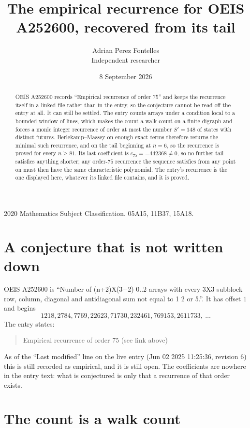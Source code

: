 \documentclass[11pt,a4paper]{article}
\title{The empirical recurrence for OEIS A252600, recovered from its tail}
\author{Adrian Perez Fontelles\\ \small Independent researcher}
\date{8 September 2026}
\theoremstyle{plain}
\theoremstyle{definition}
\begin{document}
\maketitle

\begin{abstract}
OEIS A252600 records ``Empirical recurrence of order $75$'' and keeps the recurrence itself in
a linked file rather than in the entry, so the conjecture cannot be read off the entry at all.
It can still be settled. The entry counts arrays under a condition local to a bounded window of
lines, which makes the count a walk count on a finite digraph and forces a monic integer
recurrence of order at most the number $S'=148$ of states with distinct futures. Berlekamp--Massey on
enough exact terms therefore returns the minimal such recurrence, and on the tail beginning at $n=6$, so the recurrence is proved for every $n\ge81$.
Its last coefficient is $c_{75}=-442368\neq0$, so no further tail satisfies anything
shorter; any order-$75$ recurrence the sequence satisfies from any point on must then have
the same characteristic polynomial. The entry's recurrence is the one displayed here, whatever
its linked file contains, and it is proved.
\end{abstract}

\noindent\small 2020 Mathematics Subject Classification. 05A15, 11B37, 15A18.\normalsize

\section{A conjecture that is not written down}

OEIS A252600 is ``Number of (n+2)X(3+2) 0..2 arrays with every 3X3 subblock row, column, diagonal and antidiagonal sum not equal to 1 2 or 5.''. It has offset $1$ and begins
\[
1218, 2784, 7769, 22623, 71730, 232461, 769153, 2611733,\ \dots
\]
The entry states:
\begin{quote}
Empirical recurrence of order 75 (see link above)
\end{quote}
As of the ``Last modified'' line on the live entry (Jun 02 2025 11:25:36, revision 6)
this is still recorded as empirical, and it is still open. The coefficients are nowhere in the
entry text: what is conjectured is only that a recurrence of that order exists.

\section{The count is a walk count}
\end{document}
